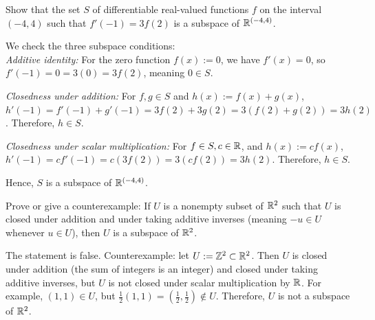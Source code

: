 \begin{xrcs}
  Show that the set $S$ of differentiable real-valued functions $f$ on the interval $(-4,4)$ such that $f'(-1) = 3f(2)$ is a subspace of $\mathbb{R}^{(-4,4)}$.

  \begin{xsol}
    We check the three subspace conditions: \\
    \emph{Additive identity:} For the zero function $f(x) := 0$, we have $f'(x) = 0$, so $f'(-1) = 0 = 3(0) = 3f(2)$, meaning $0 \in S$.

    \emph{Closedness under addition:} For $f, g \in S$ and $h(x) := f(x) + g(x)$, $h'(-1) = f'(-1) + g'(-1) = 3f(2) + 3g(2) = 3(f(2)+g(2)) = 3h(2)$. Therefore, $h \in S$.

    \emph{Closedness under scalar multiplication:} For $f \in S, c \in \mathbb{R}$, and $h(x) := cf(x)$, $h'(-1) = cf'(-1) = c(3f(2)) = 3(cf(2)) = 3h(2)$. Therefore, $h \in S$.

    Hence, $S$ is a subspace of $\mathbb{R}^{(-4,4)}$.
  \end{xsol}
\end{xrcs}

\begin{xrcs}
  Prove or give a counterexample: If $U$ is a nonempty subset of $\mathbb{R}^2$ such that $U$ is closed under addition and under taking additive inverses (meaning $-u \in U$ whenever $u \in U$), then $U$ is a subspace of $\mathbb{R}^2$.

  \begin{xsol}
    The statement is false. Counterexample: let $U := \mathbb{Z}^2 \subset \mathbb{R}^2$. Then $U$ is closed under addition (the sum of integers is an integer) and closed under taking additive inverses, but $U$ is not closed under scalar multiplication by $\mathbb{R}$. For example, $(1,1) \in U$, but $\frac{1}{2}(1,1) = (\frac{1}{2}, \frac{1}{2}) \notin U$. Therefore, $U$ is not a subspace of $\mathbb{R}^2$.
  \end{xsol}
\end{xrcs}

